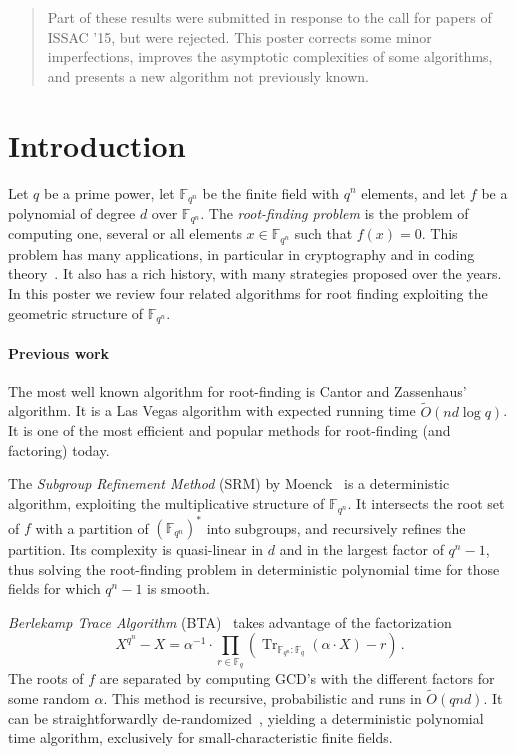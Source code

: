 \documentclass[12pt]{article}
\newcommand{\ff}[1]{\mathbb{F}_{#1}}
\newcommand{\dd}{d}
\newcommand{\qq}{q}
\newcommand{\nn}{n}
\newcommand{\qn}{{\qq^\nn}}
\newcommand{\basef}{\ff{\qq}}
\newcommand{\extf}{\ff{\qn}}
\DeclareMathOperator{\Tr}{Tr}
\newcommand{\tr}[2]{\Tr_{\ff{#1}:\ff{#2}}}
\newcommand{\bigOt}{\tilde{O}}
\newcounter{algo}
\begin{document}
\begin{abstract}
  Part of these results were submitted in response to the call for
  papers of ISSAC '15, but were rejected. This poster corrects some
  minor imperfections, improves the asymptotic complexities of some
  algorithms, and presents a new algorithm not previously known.
\end{abstract}


\section{Introduction}

Let $q$ be a prime power, let $\mathbb{F}_{\qq^\nn}$ be the finite
field with $\qq^\nn$ elements, and let $f$ be a polynomial of degree
$\dd$ over $\mathbb{F}_{\qq^\nn}$.
%
The \emph{root-finding problem} is the problem of computing one,
several or all elements $x\in\mathbb{F}_{\qq^\nn}$ such that $f(x)=0$.
%
This problem has many applications, in particular in cryptography and
in coding theory~\cite{McEliece78}. It also has a rich history, with
many strategies proposed over the years. In this poster we review four
related algorithms for root finding exploiting the geometric structure
of $\extf$.

 
\paragraph{Previous work} The most well known algorithm for
root-finding is Cantor and Zassenhaus'~\cite{cantor1981} algorithm. It
is a Las Vegas algorithm with expected running time $\bigOt(nd\log
q)$. It is one of the most efficient and popular methods for
root-finding (and factoring) today.

The \emph{Subgroup Refinement Method} (SRM) by Moenck~\cite{Moenck77}
is a deterministic algorithm, exploiting the multiplicative structure
of $\extf$. It intersects the root set of $f$ with a partition of
$(\extf)^\ast$ into subgroups, and recursively refines the
partition. Its complexity is quasi-linear in $d$ and in the largest
factor of $q^n-1$, thus solving the root-finding problem in
deterministic polynomial time for those fields for which $q^n-1$ is
smooth.

\emph{Berlekamp Trace Algorithm} (BTA)~\cite{berl70} takes advantage
of the factorization
$$X^{\qq^n}-X=\alpha^{-1} \cdot \prod_{r \in \basef}(\tr{\qq^n}{\qq}(\alpha \cdot X)-r)\,.$$
The roots of $f$ are separated by computing GCD's with the different
factors for some random $\alpha$. This method is recursive,
probabilistic and runs in $\bigOt(qnd)$. It can be straightforwardly
de-randomized~\cite{berl70,Shoup91b}, yielding a deterministic
polynomial time algorithm, exclusively for small-characteristic finite
fields.
\end{document}
